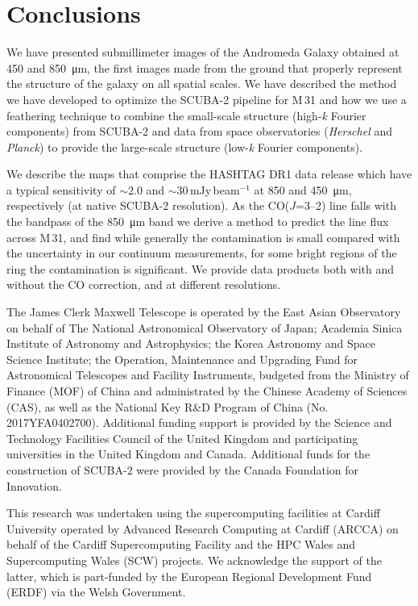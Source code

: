 \documentclass[a4paper,fleqn,usenatbib, twocolumn]{aastex63}
\begin{document}
\section{Conclusions}

We have presented submillimeter images of the Andromeda Galaxy obtained at 450 and \SI{850}{\micro\meter}, the first images
made from the ground that  properly represent the structure of the galaxy on all
spatial scales. We have described the method we have developed to optimize the SCUBA-2 pipeline for M\,31
and how we use a feathering technique to combine the small-scale structure
(high-\textit{k} Fourier components) from SCUBA-2 and data from
space observatories ({\it Herschel} and {\it Planck}) to
provide the large-scale structure (low-\textit{k} Fourier components).

We describe the maps that comprise the HASHTAG DR1 data release which have a typical sensitivity of $\sim$2.0 and 
$\sim$30\,mJy\,beam$^{-1}$ at 850 and \SI{450}{\micro\meter}, respectively (at native SCUBA-2 resolution).
As the CO($J$=3--2) line falls with the bandpass of the \SI{850}{\micro\meter} band we derive a method to 
predict the line flux across M\,31, and find while generally the contamination is small compared with the uncertainty
in our continuum measurements, for some bright regions of the ring the contamination is significant. We provide
data products both with and without the CO correction, and at different resolutions.


\acknowledgements

The James Clerk Maxwell Telescope is operated by the East Asian Observatory on behalf of The 
National Astronomical Observatory of Japan; Academia Sinica Institute of Astronomy and Astrophysics; 
the Korea Astronomy and Space Science Institute; the Operation, Maintenance and Upgrading Fund for 
Astronomical Telescopes and Facility Instruments, budgeted from the Ministry of Finance (MOF) of 
China and administrated by the Chinese Academy of Sciences (CAS), as well as the National Key R\&D 
Program of China (No. 2017YFA0402700). Additional funding support is provided by the Science and 
Technology Facilities Council of the United Kingdom and participating universities in the United Kingdom and Canada.
Additional funds for the construction of SCUBA-2 were provided by the Canada Foundation for Innovation.

This research was undertaken using the supercomputing facilities at Cardiff University operated by Advanced Research Computing at Cardiff (ARCCA) on behalf of the Cardiff Supercomputing Facility and the HPC Wales and Supercomputing Wales (SCW) projects. We acknowledge the support of the latter, which is part-funded by the European Regional Development Fund (ERDF) via the Welsh Government.
\end{document}
